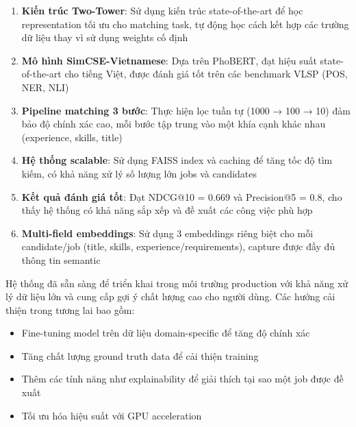 \begin{enumerate}
    \item \textbf{Kiến trúc Two-Tower}: Sử dụng kiến trúc state-of-the-art để học representation tối ưu cho matching task, tự động học cách kết hợp các trường dữ liệu thay vì sử dụng weights cố định
    
    \item \textbf{Mô hình SimCSE-Vietnamese}: Dựa trên PhoBERT, đạt hiệu suất state-of-the-art cho tiếng Việt, được đánh giá tốt trên các benchmark VLSP (POS, NER, NLI)
    
    \item \textbf{Pipeline matching 3 bước}: Thực hiện lọc tuần tự (1000 → 100 → 10) đảm bảo độ chính xác cao, mỗi bước tập trung vào một khía cạnh khác nhau (experience, skills, title)
    
    \item \textbf{Hệ thống scalable}: Sử dụng FAISS index và caching để tăng tốc độ tìm kiếm, có khả năng xử lý số lượng lớn jobs và candidates
    
    \item \textbf{Kết quả đánh giá tốt}: Đạt NDCG@10 = 0.669 và Precision@5 = 0.8, cho thấy hệ thống có khả năng sắp xếp và đề xuất các công việc phù hợp
    
    \item \textbf{Multi-field embeddings}: Sử dụng 3 embeddings riêng biệt cho mỗi candidate/job (title, skills, experience/requirements), capture được đầy đủ thông tin semantic
\end{enumerate}

Hệ thống đã sẵn sàng để triển khai trong môi trường production với khả năng xử lý dữ liệu lớn và cung cấp gợi ý chất lượng cao cho người dùng. Các hướng cải thiện trong tương lai bao gồm:

\begin{itemize}
    \item Fine-tuning model trên dữ liệu domain-specific để tăng độ chính xác
    \item Tăng chất lượng ground truth data để cải thiện training
    \item Thêm các tính năng như explainability để giải thích tại sao một job được đề xuất
    \item Tối ưu hóa hiệu suất với GPU acceleration
\end{itemize}


